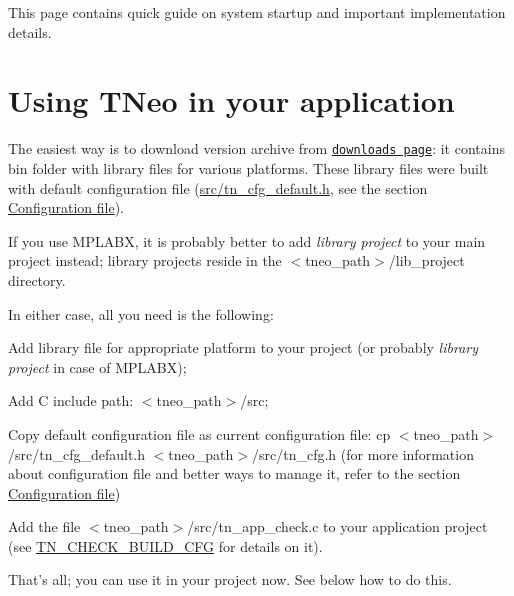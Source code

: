 This page contains quick guide on system startup and important implementation details.\hypertarget{quick_guide_usage_generic}{}\section{Using T\+Neo in your application}\label{quick_guide_usage_generic}
The easiest way is to download version archive from \href{https://bitbucket.org/dfrank/tneokernel/downloads}{\tt downloads page}\+: it contains {\ttfamily bin} folder with library files for various platforms. These library files were built with default configuration file ({\ttfamily \hyperlink{tn__cfg__default_8h}{src/tn\+\_\+cfg\+\_\+default.\+h}}, see the section \hyperlink{building_configuration_file}{Configuration file}).

If you use M\+P\+L\+A\+B\+X, it is probably better to add {\itshape library project} to your main project instead; library projects reside in the {\ttfamily $<$tneo\+\_\+path$>$/lib\+\_\+project} directory.

In either case, all you need is the following\+:


\begin{DoxyItemize}
\item Add library file for appropriate platform to your project (or probably {\itshape library project} in case of M\+P\+L\+A\+B\+X);
\item Add C include path\+: {\ttfamily $<$tneo\+\_\+path$>$/src};
\item Copy default configuration file as current configuration file\+: {\ttfamily cp $<$tneo\+\_\+path$>$/src/tn\+\_\+cfg\+\_\+default.h $<$tneo\+\_\+path$>$/src/tn\+\_\+cfg.h} (for more information about configuration file and better ways to manage it, refer to the section \hyperlink{building_configuration_file}{Configuration file})
\item Add the file {\ttfamily $<$tneo\+\_\+path$>$/src/tn\+\_\+app\+\_\+check.c} to your application project (see {\ttfamily \hyperlink{tn__cfg__default_8h_aacdc913eb66492cf69cf02a5de73578e}{T\+N\+\_\+\+C\+H\+E\+C\+K\+\_\+\+B\+U\+I\+L\+D\+\_\+\+C\+F\+G}} for details on it).
\end{DoxyItemize}

That's all; you can use it in your project now. See below how to do this.


